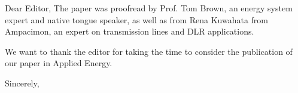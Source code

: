 \documentclass[12pt]{SHUletter}
\begin{document}
\begin{letter}{Dear Editor,}
		The paper was proofread by Prof. Tom Brown, an energy system expert and native tongue speaker, as well as from Rena Kuwahata from Ampacimon, an expert on transmission lines and DLR applications.

		We want to thank the editor for taking the time to consider the publication of our paper in Applied Energy.




		\closing{Sincerely,}
	\end{letter}
\end{document}
